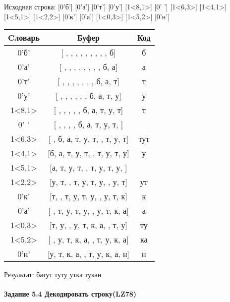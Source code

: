 \documentclass[a4paper, 12pt]{article}
\begin{document}
Исходная строка: [0'б'] [0'а'] [0'т'] [0'у'] [1<8,1>] [0' '] [1<6,3>] [1<4,1>] [1<5,1>] [1<2,2>] [0'к'] [0'а'] [1<0,3>] [1<5,2>] [0'н']\\
\begin{table}[h!]
\centering
\begin{tabular}{|c|c|c|}
\hline
 Cловарь & Буфер & Код  \\ \hline
0'б' & [ ,  ,  ,  ,  ,  ,  ,  ,  , б] & б
\\ \hline
0'а' & [ ,  ,  ,  ,  ,  ,  ,  , б, а] & а
\\ \hline
0'т' & [ ,  ,  ,  ,  ,  ,  , б, а, т] & т
\\ \hline
0'у' & [ ,  ,  ,  ,  ,  , б, а, т, у] & у
\\ \hline
1<8,1> & [ ,  ,  ,  ,  , б, а, т, у, т] & т
\\ \hline
0' ' & [ ,  ,  ,  , б, а, т, у, т,  ] &  
\\ \hline
1<6,3> & [ , б, а, т, у, т,  , т, у, т] & тут
\\ \hline
1<4,1> & [б, а, т, у, т,  , т, у, т, у] & у
\\ \hline
1<5,1> & [а, т, у, т,  , т, у, т, у,  ] &  
\\ \hline
1<2,2> & [у, т,  , т, у, т, у,  , у, т] & ут
\\ \hline
0'к' & [т,  , т, у, т, у,  , у, т, к] & к
\\ \hline
0'а' & [ , т, у, т, у,  , у, т, к, а] & а
\\ \hline
1<0,3> & [т, у,  , у, т, к, а,  , т, у] &  ту
\\ \hline
1<5,2> & [ , у, т, к, а,  , т, у, к, а] & ка
\\ \hline
0'н' & [у, т, к, а,  , т, у, к, а, н] & н
\\ \hline
\end{tabular}
\end{table}

Результат: батут туту утка тукан
\pagebreak
\paragraph{Задание 5.4 Декодировать строку(LZ78)\\}
\end{document}
